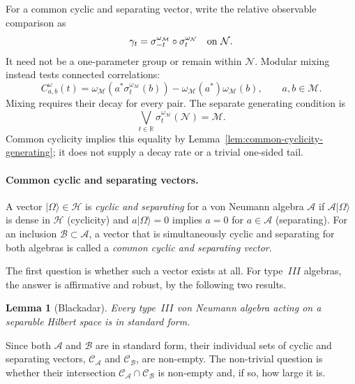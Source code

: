 \documentclass[a4paper,11pt]{article}
\newtheorem{lemma}[theorem]{Lemma}
\theoremstyle{definition}
\begin{document}
For a common cyclic and separating vector, write the relative observable comparison as
\begin{equation}
 \gamma_t=\sigma_{-t}^{\omega_{\mathcal M}}\circ\sigma_t^{\omega_{\mathcal N}}
 \quad\hbox{on }\mathcal N.
 \label{eq:coarse-graining-flow}
\end{equation}
It need not be a one-parameter group or remain within $\mathcal N$.
Modular mixing instead tests connected correlations:
\begin{equation}
 C_{a,b}^{\omega}(t)=\omega_{\mathcal M}(a^*\sigma_t^{\omega_{\mathcal M}}(b))
 -\omega_{\mathcal M}(a^*)\omega_{\mathcal M}(b),\qquad a,b\in\mathcal M.
 \label{eq:quantum-correlation}
\end{equation}
Mixing requires their decay for every pair. The separate generating condition is
\begin{equation}
 \bigvee_{t\in\mathbb R}\sigma_t^{\omega_{\mathcal M}}(\mathcal N)=\mathcal M.
 \label{eq:topological-transitivity}
\end{equation}
Common cyclicity implies this equality by Lemma~\ref{lem:common-cyclicity-generating};
it does not supply a decay rate or a trivial one-sided tail.

\paragraph{Common cyclic and separating vectors.}
A vector $|\Omega\rangle\in\mathcal{H}$ is \emph{cyclic and separating} for a von Neumann
algebra $\mathcal{A}$ if $\mathcal{A}|\Omega\rangle$ is dense in $\mathcal{H}$ (cyclicity)
and $a|\Omega\rangle=0$ implies $a=0$ for $a\in\mathcal{A}$ (separating).  For an
inclusion $\mathcal{B}\subset\mathcal{A}$, a vector that is simultaneously cyclic and
separating for both algebras is called a \emph{common cyclic and separating vector}.

The first question is whether such a vector exists at all.  For type~$III$ algebras,
the answer is affirmative and robust, by the following two results.

\begin{lemma}[Blackadar]\label{lem:typeIII-standard}
Every type~$III$ von Neumann algebra acting on a separable Hilbert space is in
standard form.
\end{lemma}

\noindent Since both $\mathcal{A}$ and $\mathcal{B}$ are in standard form, their individual
sets of cyclic and separating vectors, $\mathcal{C}_\mathcal{A}$ and $\mathcal{C}_\mathcal{B}$,
are non-empty.  The non-trivial question is whether their intersection
$\mathcal{C}_\mathcal{A}\cap\mathcal{C}_\mathcal{B}$ is non-empty and, if so, how large it is.
\end{document}
